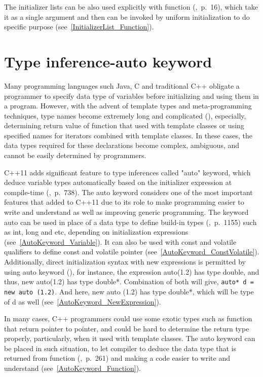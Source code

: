 \documentclass[11pt]{report}
\begin{document}
The initializer lists can be also used explicitly with function (\cite{Reddy:2011:API},~p.~16), which take it as a single argument and then can be invoked by uniform initialization to do specific purpose (see~\ref{InitializerList_Function}).

\section{Type inference-auto keyword}
\label{section: Auto keyword}
Many programming languages such Java, C and traditional C++ obligate a programmer to specify data type of variables before initializing and using them in a program. However, with the advent of template types and meta-programming techniques, type names become extremely long and complicated (\cite{Stroustrup:2012:Cpp11}), especially, determining return value of function that used with template classes or using specified names for iterators combined with template classes. In these cases, the data types required for these declarations become complex, ambiguous, and cannot be easily determined by programmers.

C++11 adds significant feature to type inferences called "auto" keyword, which deduce variable types automatically based on the initializer expression at compile-time (\cite{Gregorie:professionalcpp},~p.~738). The auto keyword considers one of the most important features that added to C++11 due to its role to make programming easier to write and understand as well as improving generic programming. The keyword auto can be used in place of a data type to define build-in types (\cite{Prata:2012:Cpp},~p.~1155) such as int, long and etc, depending on initialization expressions (see~\ref{AutoKeyword_Variable}). It can also be used with const and volatile qualifiers to define const and volatile pointer (see~\ref{AutoKeyword_ConstVolatile}). Additionally, direct initialization syntax with new expressions is permitted by using auto keyword (\cite{Stroustrup:2012:Cpp11}), for instance, the expression auto(1.2) has type double, and thus, new auto(1.2) has type double*. Combination of both will give, \texttt{auto* d = new auto (1.2)}. And here, new auto (1.2) has type double*, which will be type of d as well (see~\ref{AutoKeyword_NewExpression}).

In many cases, C++ programmers could use some exotic types such as function that return pointer to pointer, and could be hard to determine the return type properly, particularly, when it used with template classes. The auto keyword can be placed in such situation, to let compiler to deduce the data type that is returned from function (\cite{Overland:2011:CWF},~p.~261) and making a code easier to write and understand (see~\ref{AutoKeyword_Function}).
\end{document}

